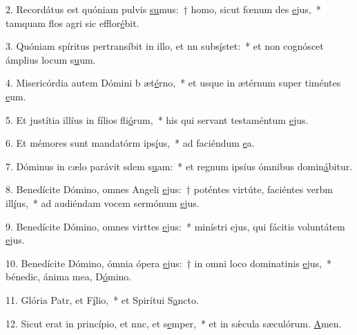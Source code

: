 2. Recordátus est quóniam pulvis \uline{su}mus:~† homo, sicut fœnum des \uline{e}jus,~* tamquam flos agri sic efflor\uline{é}bit.\par 
3. Quóniam spíritus pertransíbit in illo, et nn subs\uline{í}stet:~* et non cognóscet ámplius locum s\uline{u}um.\par 
4. Misericórdia autem Dómini b æt\uline{é}rno,~* et usque in ætérnum super timéntes \uline{e}um.\par 
5. Et justítia illíus in fílios fli\uline{ó}rum,~* his qui servant testaméntum \uline{e}jus.\par 
6. Et mémores sunt mandatórm ips\uline{í}us,~* ad faciéndum \uline{e}a.\par 
7. Dóminus in cælo parávit sdem s\uline{u}am:~* et regnum ipsíus ómnibus domin\uline{á}bitur.\par 
8. Benedícite Dómino, omnes Angeli \uline{e}jus:~† poténtes virtúte, faciéntes verbm ill\uline{í}us,~* ad audiéndam vocem sermónum \uline{e}jus.\par 
9. Benedícite Dómino, omnes virttes \uline{e}jus:~* minístri ejus, qui fácitis voluntátem \uline{e}jus.\par 
10. Benedícite Dómino, ómnia ópera \uline{e}jus:~† in omni loco dominatinis \uline{e}jus,~* bénedic, ánima mea, D\uline{ó}mino.\par 
11. Glória Patr, et F\uline{í}lio,~* et Spirítui S\uline{a}ncto.\par 
12. Sicut erat in princípio, et nnc, et s\uline{e}mper,~* et in sǽcula sæculórum. \uline{A}men.\par 
